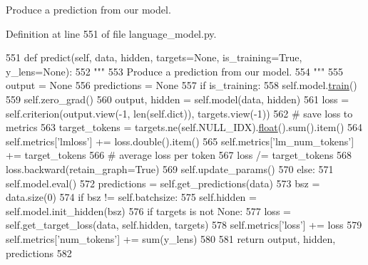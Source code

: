 \begin{DoxyVerb}Produce a prediction from our model.
\end{DoxyVerb}
 

Definition at line 551 of file language\+\_\+model.\+py.


\begin{DoxyCode}
551     \textcolor{keyword}{def }predict(self, data, hidden, targets=None, is\_training=True, y\_lens=None):
552         \textcolor{stringliteral}{"""}
553 \textcolor{stringliteral}{        Produce a prediction from our model.}
554 \textcolor{stringliteral}{        """}
555         output = \textcolor{keywordtype}{None}
556         predictions = \textcolor{keywordtype}{None}
557         \textcolor{keywordflow}{if} is\_training:
558             self.model.\hyperlink{namespaceprojects_1_1mastering__the__dungeon_1_1mturk_1_1tasks_1_1MTD_1_1run_a36a5f4f6f9df0611a6818610518d2cf0}{train}()
559             self.zero\_grad()
560             output, hidden = self.model(data, hidden)
561             loss = self.criterion(output.view(-1, len(self.dict)), targets.view(-1))
562             \textcolor{comment}{# save loss to metrics}
563             target\_tokens = targets.ne(self.NULL\_IDX).\hyperlink{namespaceprojects_1_1controllable__dialogue_1_1make__control__dataset_aa2b7207688c641dbc094ab44eca27113}{float}().sum().item()
564             self.metrics[\textcolor{stringliteral}{'lmloss'}] += loss.double().item()
565             self.metrics[\textcolor{stringliteral}{'lm\_num\_tokens'}] += target\_tokens
566             \textcolor{comment}{# average loss per token}
567             loss /= target\_tokens
568             loss.backward(retain\_graph=\textcolor{keyword}{True})
569             self.update\_params()
570         \textcolor{keywordflow}{else}:
571             self.model.eval()
572             predictions = self.get\_predictions(data)
573             bsz = data.size(0)
574             \textcolor{keywordflow}{if} bsz != self.batchsize:
575                 self.hidden = self.model.init\_hidden(bsz)
576             \textcolor{keywordflow}{if} targets \textcolor{keywordflow}{is} \textcolor{keywordflow}{not} \textcolor{keywordtype}{None}:
577                 loss = self.get\_target\_loss(data, self.hidden, targets)
578                 self.metrics[\textcolor{stringliteral}{'loss'}] += loss
579                 self.metrics[\textcolor{stringliteral}{'num\_tokens'}] += sum(y\_lens)
580 
581         \textcolor{keywordflow}{return} output, hidden, predictions
582 
\end{DoxyCode}
\mbox{\label{classparlai_1_1agents_1_1language__model_1_1language__model_1_1LanguageModelAgent_a058d0497a88662c2d523b3b5a836a0bb}} 

